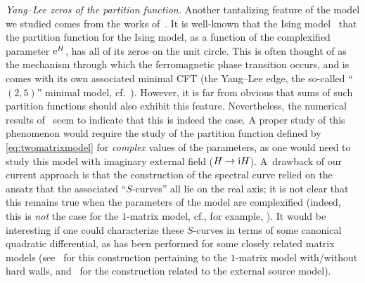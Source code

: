 \documentclass[pdftex]{sigma}
\numberwithin{equation}{section}
\begin{document}
\textit{Yang--Lee zeros of the partition function.} Another tantalizing feature of the model we studied comes from the works of~\cite{AAM1,AAM2, Staudacher}. It is well-known that the Ising model~\cite{YangLee2, YangLee1} that the partition function for the
Ising model, as a function of the complexified parameter ${\rm e}^H$, has all of its zeros on the unit circle. This is often thought of as
the mechanism through which the ferromagnetic phase transition occurs, and is comes with its own associated minimal CFT
(the Yang--Lee edge, the so-called ``$(2,5)$'' minimal model, cf.~\cite{Cardy}). However, it is far from obvious that sums of
such partition functions should also exhibit this feature. Nevertheless, the numerical results of~\cite{AAM1,AAM2,AAD, Staudacher}
seem to indicate that this is indeed the case. A proper study of this phenomenon would require the study of the partition
function defined by \eqref{eq:twomatrixmodel} for \textit{complex} values of the parameters, as one would need to study this model
with imaginary external field ($H\to {\rm i}H$). A~drawback of our current approach is that the construction of the spectral curve
relied on the ansatz that the associated ``$S$-curves'' all lie on the real axis; it is not clear that this remains true when
the parameters of the model are complexified (indeed, this is \textit{not} the case for the $1$-matrix model, cf., for example, \cite{Bertola-Tovbis,BGM}). It would be interesting if one could characterize these $S$-curves in terms of some
canonical quadratic differential, as has been performed for some closely related matrix models (see~\cite{KS, Rakhmanov} for
this construction pertaining to the $1$-matrix model with/without hard walls, and~\cite{MFS1,MFS2,MFS3} for the construction
related to the external source model).

\appendix
\end{document}
